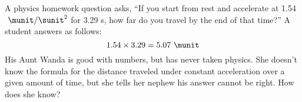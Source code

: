  A physics homework question asks, ``If you start from
rest and accelerate at 1.54 $\ \munit/\sunit^2$ for 3.29 s, how far do
you travel by the end of that time?'' A student answers as follows:
\begin{equation*}
            1.54 \times 3.29  =  5.07\ \munit
\end{equation*}
His Aunt Wanda is good with numbers, but has never taken
physics. She doesn't know the formula for the distance
traveled under constant acceleration over a given amount of
time, but she tells her nephew his answer cannot be
right. How does she know?

